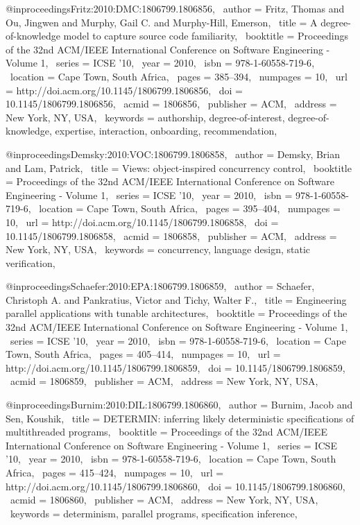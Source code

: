 @inproceedings{Fritz:2010:DMC:1806799.1806856,
 author = {Fritz, Thomas and Ou, Jingwen and Murphy, Gail C. and Murphy-Hill, Emerson},
 title = {A degree-of-knowledge model to capture source code familiarity},
 booktitle = {Proceedings of the 32nd ACM/IEEE International Conference on Software Engineering - Volume 1},
 series = {ICSE '10},
 year = {2010},
 isbn = {978-1-60558-719-6},
 location = {Cape Town, South Africa},
 pages = {385--394},
 numpages = {10},
 url = {http://doi.acm.org/10.1145/1806799.1806856},
 doi = {10.1145/1806799.1806856},
 acmid = {1806856},
 publisher = {ACM},
 address = {New York, NY, USA},
 keywords = {authorship, degree-of-interest, degree-of-knowledge, expertise, interaction, onboarding, recommendation},
} 

@inproceedings{Demsky:2010:VOC:1806799.1806858,
 author = {Demsky, Brian and Lam, Patrick},
 title = {Views: object-inspired concurrency control},
 booktitle = {Proceedings of the 32nd ACM/IEEE International Conference on Software Engineering - Volume 1},
 series = {ICSE '10},
 year = {2010},
 isbn = {978-1-60558-719-6},
 location = {Cape Town, South Africa},
 pages = {395--404},
 numpages = {10},
 url = {http://doi.acm.org/10.1145/1806799.1806858},
 doi = {10.1145/1806799.1806858},
 acmid = {1806858},
 publisher = {ACM},
 address = {New York, NY, USA},
 keywords = {concurrency, language design, static verification},
} 

@inproceedings{Schaefer:2010:EPA:1806799.1806859,
 author = {Schaefer, Christoph A. and Pankratius, Victor and Tichy, Walter F.},
 title = {Engineering parallel applications with tunable architectures},
 booktitle = {Proceedings of the 32nd ACM/IEEE International Conference on Software Engineering - Volume 1},
 series = {ICSE '10},
 year = {2010},
 isbn = {978-1-60558-719-6},
 location = {Cape Town, South Africa},
 pages = {405--414},
 numpages = {10},
 url = {http://doi.acm.org/10.1145/1806799.1806859},
 doi = {10.1145/1806799.1806859},
 acmid = {1806859},
 publisher = {ACM},
 address = {New York, NY, USA},
} 

@inproceedings{Burnim:2010:DIL:1806799.1806860,
 author = {Burnim, Jacob and Sen, Koushik},
 title = {DETERMIN: inferring likely deterministic specifications of multithreaded programs},
 booktitle = {Proceedings of the 32nd ACM/IEEE International Conference on Software Engineering - Volume 1},
 series = {ICSE '10},
 year = {2010},
 isbn = {978-1-60558-719-6},
 location = {Cape Town, South Africa},
 pages = {415--424},
 numpages = {10},
 url = {http://doi.acm.org/10.1145/1806799.1806860},
 doi = {10.1145/1806799.1806860},
 acmid = {1806860},
 publisher = {ACM},
 address = {New York, NY, USA},
 keywords = {determinism, parallel programs, specification inference},
} 


